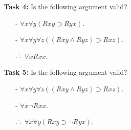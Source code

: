 \documentclass[a4paper, 11pt]{article} %
\newcommand{\tuple}[1]{\langle#1\rangle} %
\def\therefore{\ensuremath{\ldotp\dot\,\ldotp}}
\begin{document}
\begin{enumerate}
  \item[\bf Task 4:] Is the following argument valid? 
    \begin{itemize}
      \item[-] $\forall x\forall y(Rxy \supset Ryx)$.
      \item[-] $\forall x\forall y\forall z((Rxy \wedge Ryz) \supset Rxz)$.
      \item[$\therefore$] $\forall xRxx$.
    \end{itemize}
  \item[\bf Task 5:] Is the following argument valid?
    \begin{itemize}
      \item[-] $\forall x\forall y\forall z((Rxy \wedge Ryz) \supset Rxz)$.
      \item[-] $\forall x\neg Rxx$.
      \item[$\therefore$] $\forall x\forall y(Rxy \supset \neg Ryx)$.
    \end{itemize}

\end{enumerate}
\end{document}
